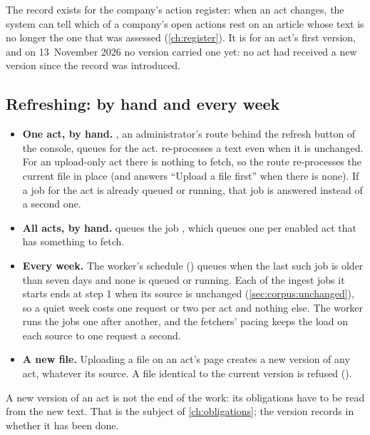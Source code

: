 The record exists for the company's action register: when an act changes, the system can
tell which of a company's open actions rest on an article whose text is no longer the one
that was assessed (\cref{ch:register}). It is  for an act's first version, and on
13~November 2026 no version carried one yet: no act had received a new version since the
record was introduced.

\subsection{Refreshing: by hand and every week}\label{sec:corpus:refresh}

\begin{itemize}
  \item \textbf{One act, by hand.} , an
    administrator's route behind the refresh button of the console, queues
     for the act.  re-processes a text even when it is
    unchanged. For an upload-only act there is nothing to fetch, so the route re-processes
    the current file in place (and answers \enquote{Upload a file first} when there is
    none). If a job for the act is already queued or running, that job is answered instead of
    a second one.
  \item \textbf{All acts, by hand.}  queues the job
    , which queues one  per enabled act that
    has something to fetch.
  \item \textbf{Every week.} The worker's schedule () queues
     when the last such job is older than seven days and none is
    queued or running. Each of the ingest jobs it starts ends at step 1 when its source is
    unchanged (\cref{sec:corpus:unchanged}), so a quiet week costs one request or two per act
    and nothing else. The worker runs the jobs one after another, and the fetchers' pacing
    keeps the load on each source to one request a second.
  \item \textbf{A new file.} Uploading a file on an act's page creates a new version of any
    act, whatever its source. A file identical to the current version is refused
    ().
\end{itemize}

A new version of an act is not the end of the work: its obligations have to be read from the
new text. That is the subject of \cref{ch:obligations}; the version records in
 whether it has been done.


